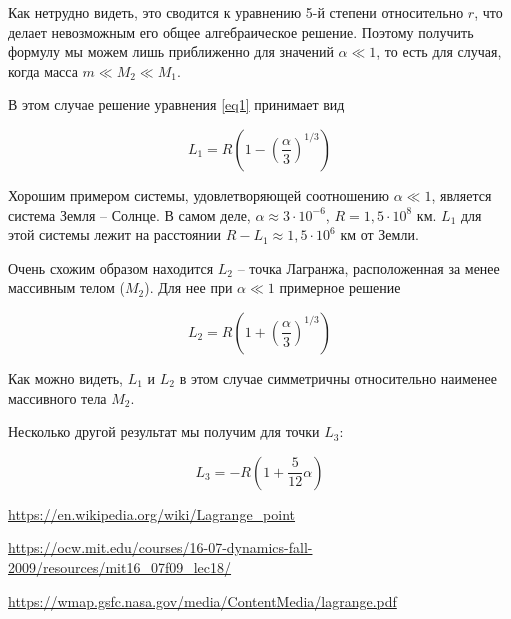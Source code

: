 \documentclass[12pt]{article}
\begin{document}
    Как нетрудно видеть, это сводится к уравнению 5-й степени относительно $r$,
    что делает невозможным его общее алгебраическое решение. Поэтому получить
    формулу мы можем лишь приближенно для значений $\alpha \ll 1$, то есть для
    случая, когда масса $m \ll M_2 \ll M_1$.
    \par В этом случае решение уравнения \ref{eq1} принимает вид

    \begin{equation}
        L_1 = R\left(1 - \left(\frac{\alpha}{3}\right)^{1/3}\right)
    \end{equation}

    \par Хорошим примером системы, удовлетворяющей соотношению $\alpha \ll 1$,
    является система Земля -- Солнце. В самом деле,
    $\alpha \approx 3 \cdot 10^{-6}$, $R = 1{,}5 \cdot 10^8$ км.
    $L_1$ для этой системы лежит на расстоянии $R - L_1 \approx 1{,}5 \cdot 10^6$
    км от Земли.

    \par Очень схожим образом находится $L_2$ -- точка Лагранжа, расположенная
    за менее массивным телом ($M_2$). Для нее при $\alpha \ll 1$ примерное
    решение

    \begin{equation}
        L_2 = R\left(1 + \left(\frac{\alpha}{3}\right)^{1/3}\right)
    \end{equation}

    \par Как можно видеть, $L_1$ и $L_2$ в этом случае симметричны относительно
    наименее массивного тела $M_2$.

    Несколько другой результат мы получим для точки $L_3$:

    \begin{equation}
        L_3 = -R\left(1 + \frac{5}{12}\alpha\right)
    \end{equation}

    \begin{thebibliography}{10}
        \url{https://en.wikipedia.org/wiki/Lagrange_point}

        \url{https://ocw.mit.edu/courses/16-07-dynamics-fall-2009/resources/mit16_07f09_lec18/}

        \url{https://wmap.gsfc.nasa.gov/media/ContentMedia/lagrange.pdf}
    \end{thebibliography}
\end{document}
